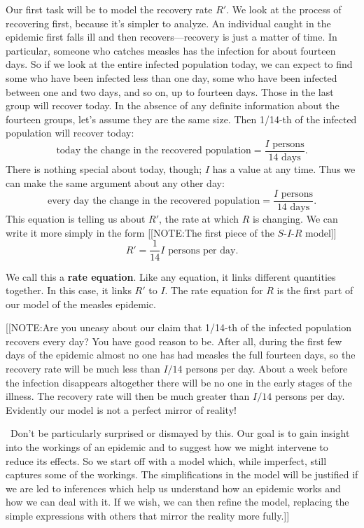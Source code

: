 Our first task will be to model the recovery rate $R'$.  We look at
the process of recovering first, because it's simpler to analyze.  An
individual caught in the epidemic first falls ill and then
recovers---recovery is just a matter of time.  In particular, someone
who catches measles has the infection for about
fourteen days.  So if we look at the entire infected population today,
we can expect to find some who have been infected less than one day,
some who have been infected between one and two days, and so on, up to
fourteen days.  Those in the last group will recover today.  In the
absence of any definite information about the fourteen groups, let's
assume they are the same size.  Then 1/14-th of the infected
population will recover today:
\[
\mbox{today the change in the recovered population} = 
          \dfrac{I \mbox{ persons}}{14 \mbox{ days}}.
\]
There is nothing special about today, though; $I$ has a value at any
time.  Thus we can make the same argument about any other day:
\[
\mbox{every day the change in the recovered population} 
		= \dfrac{I \mbox{ persons}}{14 \mbox{ days}}.
\]
This equation is telling us about $R'$, the rate at which $R$ is
changing.  We can write it more simply in the form
[[NOTE:The first piece of the $S$-$I$-$R$ model]]
\[
R' = \dfrac{1}{14}I \mbox{ persons per day} .
\]



We call this a {\bf rate equation}. Like any
equation, it links different quantities together.  In this case, it
links $R'$ to $I$.  The rate equation for $R$ is the first part of our
model of the measles epidemic.

[[NOTE:Are you uneasy about our claim that {1/14-th} of the infected
  population recovers every day?  You have good reason to be.  After
  all, during the first few days of the epidemic almost no one has had
  measles the full fourteen days, so the recovery rate will be much
  less than $I/14$ persons per day.  About a week before the infection
  disappears altogether there will be no one in the early stages of
  the illness.  The recovery rate will then be much greater than
  $I/14$ persons per day.  Evidently our model is not a perfect mirror
  of reality!

\quad \ Don't be particularly surprised or dismayed by this.  Our goal
is to gain insight into the workings of an epidemic and to suggest how
we might intervene to reduce its effects.  So we start off with a
model which, while imperfect, still captures some of the workings.
The simplifications in the model will be justified if we are led to
inferences which help us understand how an epidemic works and how we
can deal with it.  If we wish, we can then refine the model, replacing
the simple expressions with others that mirror the reality more
fully.]]

